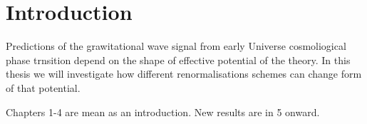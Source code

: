 \chapter{Introduction}
Predictions of the grawitational wave signal from early Universe cosmoliogical phase trnsition 
depend on the shape of effective potential of the theory. 
In this thesis we will investigate how different renormalisations schemes can change 
form of that potential. 

Chapters 1-4 are mean as an introduction.
New results are in 5 onward.

